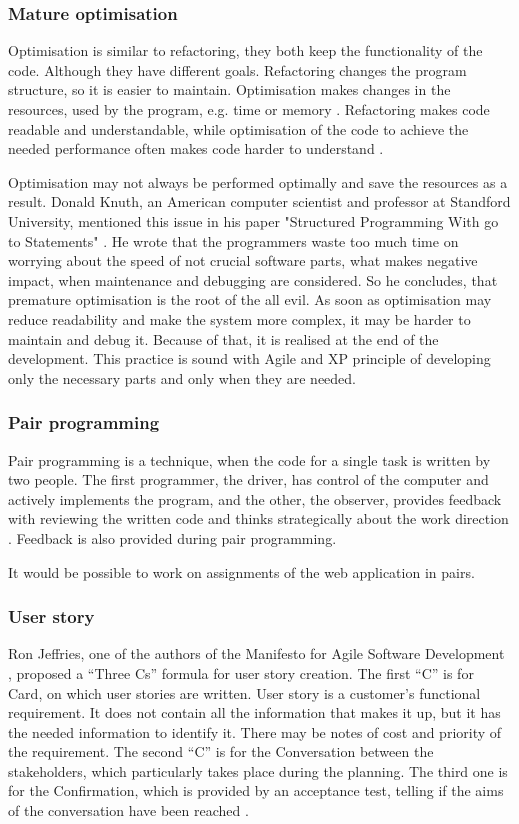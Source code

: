 \subsubsection{Mature optimisation}
Optimisation is similar to refactoring, they both keep the functionality of the code. Although they have different goals. Refactoring changes the program structure, so it is easier to maintain. Optimisation makes changes in the resources, used by the program, e.g. time or memory \cite{lc_effectively}. Refactoring makes code readable and understandable, while optimisation of the code to achieve the needed performance often makes code harder to understand \cite{ref_ec}.

Optimisation may not always be performed optimally and save the resources as a result. Donald Knuth, an American computer scientist and professor at Standford University, mentioned this issue in his paper "Structured Programming With go to Statements" \cite{knuth_goto}. He wrote that the programmers waste too much time on worrying about the speed of not crucial software parts, what makes negative impact, when maintenance and debugging are considered. So he concludes, that premature optimisation is the root of the all evil. As soon as optimisation may reduce readability and make the system more complex, it may be harder to maintain and debug it. Because of that, it is realised at the end of the development. This practice is sound with Agile and XP principle of developing only the necessary parts and only when they are needed.

\subsubsection{Pair programming}
Pair programming is a technique, when the code for a single task is written by two people. The first programmer, the driver, has control of the computer and actively implements the program, and the other, the observer, provides feedback with reviewing the written code and thinks strategically about the work direction \cite{pair_prog}. Feedback is also provided during pair programming. 

It would be possible to work on assignments of the web application in pairs.

\subsubsection{User story}
Ron Jeffries, one of the authors of the Manifesto for Agile Software Development \cite{manifesto}, proposed a ``Three Cs'' formula for user story creation. The first ``C'' is for Card, on which user stories are written. User story is a customer's functional requirement. It does not contain all the information that makes it up, but it has the needed information to identify it. There may be notes of cost and priority of the requirement. The second ``C'' is for the Conversation between the stakeholders, which particularly takes place during the planning. The third one is for the Confirmation, which is provided by an acceptance test, telling if the aims of the conversation have been reached \cite{rj_3c}.

